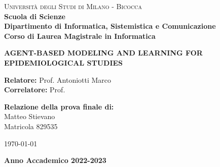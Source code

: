 \begin{titlepage}

    \noindent
    \begin{minipage}[t]{0.19\textwidth}
    \end{minipage}
    \begin{minipage}[t]{0.81\textwidth}
    {
            {\textsc{Università degli Studi di Milano - Bicocca}} \\
            \textbf{Scuola di Scienze} \\
            \textbf{Dipartimento di Informatica, Sistemistica e Comunicazione} \\
            \textbf{Corso di Laurea Magistrale in Informatica} \\
            \par
    }
    \end{minipage}

\vspace{20mm}

\begin{center}
        {\LARGE{
                \textbf{AGENT-BASED MODELING AND LEARNING FOR EPIDEMIOLOGICAL STUDIES}
                \par
        }}
    \end{center}

    \vspace{60mm}

    \noindent
    {\large \textbf{Relatore:} Prof. Antoniotti Marco} \\

    \noindent
    {\large \textbf{Correlatore:} Prof. }

    \vspace{10mm}

    \begin{flushright}
        {\large \textbf{Relazione della prova finale di:}} \\
        \large{Matteo Stievano} \\
        \large{Matricola 829535}
    \end{flushright}

    \vspace{10mm}
    \today
    \begin{center}
        {\large{\bf Anno Accademico 2022-2023}}
    \end{center}

    \restoregeometry

\end{titlepage}